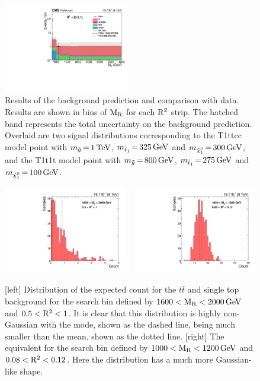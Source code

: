 \begin{figure}[htpb]
\includegraphics[width=0.49\textwidth]{figures/razor_results/bg_prediction_plot_R2bin4}
\caption{Results of the background prediction and comparison with data. Results are shown in bins of
$\mathrm{M_R}$ for each $\mathrm{R^2}$ strip. 
The hatched band represents the total uncertainty on the background prediction. 
Overlaid are two signal distributions corresponding to the T1ttcc model point with
$m_{\tilde{g}} \,{=}\, 1\,\text{Te\hspace{-.08em}V}$, $m_{\tilde{t}_1} \,{=}\, 325\,\text{Ge\hspace{-.08em}V}$ and $m_{\tilde{\chi}_1^0} \,{=}\,
300\,\text{Ge\hspace{-.08em}V}$, and the T1t1t model point with $m_{\tilde{g}} \,{=}\, 800\,\text{Ge\hspace{-.08em}V}$, $m_{\tilde{t}_1}
\,{=}\, 275\,\text{Ge\hspace{-.08em}V}$ and $m_{\tilde{\chi}_1^0} \,{=}\, 100\,\text{Ge\hspace{-.08em}V}$. 
\label{fig:results_prediction}}
\end{figure}



\begin{figure}[htpb]
  \centering
  \includegraphics[width=0.48\textwidth]{figures/razor_results/mean_mode_b_S_TTJ_019}
  ~
  \includegraphics[width=0.48\textwidth]{figures/razor_results/mean_mode_b_S_TTJ_005}
  \caption{[left] Distribution of the expected count for the $t\bar{t}$ and single top background
for the search bin defined by $1600 < \mathrm{M_R} < 2000\,\text{Ge\hspace{-.08em}V}$ and $0.5 < \mathrm{R^2} < 1$. It is clear that this
distribution is highly non-Gaussian with the mode, shown as the dashed line, being much smaller than
the mean, shown as the dotted line. [right] The equivalent for the search bin defined by $1000 < \mathrm{M_R}
< 1200\,\text{Ge\hspace{-.08em}V}$ and $0.08 < \mathrm{R^2} < 0.12$. Here the distribution has a much more Gaussian-like shape.
  \label{fig:boost_results_mean_mode}}
\end{figure}



